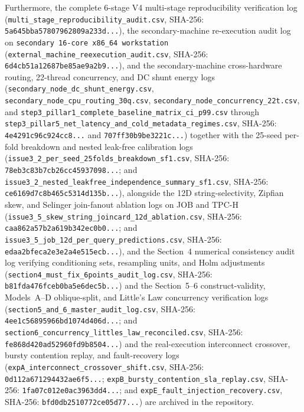 \documentclass[10pt,a4paper]{article}
\begin{document}
Furthermore, the complete 6-stage V4 multi-stage reproducibility verification log (\texttt{multi\_stage\_reproducibility\_audit.csv}, SHA-256: \texttt{5a645bba57807962809a233d...}), the secondary-machine re-execution audit log on \texttt{secondary 16-core x86\_64 workstation} (\texttt{external\_machine\_reexecution\_audit.csv}, SHA-256: \texttt{6d4cb51a12687be85ae9a2b9...}), and the secondary-machine cross-hardware routing, 22-thread concurrency, and DC shunt energy logs (\texttt{secondary\_node\_dc\_shunt\_energy.csv}, \texttt{secondary\_node\_cpu\_routing\_30q.csv}, \texttt{secondary\_node\_concurrency\_22t.csv}, and \texttt{step3\_pillar1\_complete\_baseline\_matrix\_ci\_p99.csv} through \texttt{step3\_pillar5\_net\_latency\_and\_cold\_metadata\_regimes.csv}, SHA-256: \texttt{4e4291c96c924cc8...} and \texttt{707ff30b9be3221c...}) together with the 25-seed per-fold breakdown and nested leak-free calibration logs (\texttt{issue3\_2\_per\_seed\_25folds\_breakdown\_sf1.csv}, SHA-256: \texttt{78eb3c83b7cb26cc45937098...}; and \texttt{issue3\_2\_nested\_leakfree\_independence\_summary\_sf1.csv}, SHA-256: \texttt{ce6169d7c8b465c5314d135b...}), alongside the 12D string-selectivity, Zipfian skew, and Selinger join-fanout ablation logs on JOB and TPC-H (\texttt{issue3\_5\_skew\_string\_joincard\_12d\_ablation.csv}, SHA-256: \texttt{caa862a57b2a619b342ec0b0...}; and \texttt{issue3\_5\_job\_12d\_per\_query\_predictions.csv}, SHA-256: \texttt{edaa2bfeca2e3e2a4e515ecb...}), and the Section~4 numerical consistency audit log verifying conditioning sets, resampling units, and Holm adjustments (\texttt{section4\_must\_fix\_6points\_audit\_log.csv}, SHA-256: \texttt{b81fda476fceb0ba5e6dec5b...}) and the Section~5--6 construct-validity, Models~A--D oblique-split, and Little's Law concurrency verification logs (\texttt{section5\_and\_6\_master\_audit\_log.csv}, SHA-256: \texttt{4ee1c56895966bd1074d406d...}; and \texttt{section6\_concurrency\_littles\_law\_reconciled.csv}, SHA-256: \texttt{fe868d420ad52960fd9b8504...}) and the real-execution interconnect crossover, bursty contention replay, and fault-recovery logs (\texttt{expA\_interconnect\_crossover\_shift.csv}, SHA-256: \texttt{0d112a671294432ae6f5...}; \texttt{expB\_bursty\_contention\_sla\_replay.csv}, SHA-256: \texttt{1fa07c012e0ac3963dd4...}; and \texttt{expE\_fault\_injection\_recovery.csv}, SHA-256: \texttt{bfd0db2510772ce05d77...}) are archived in the repository.
\end{document}
